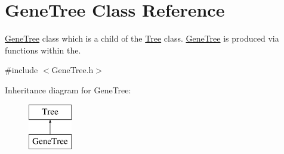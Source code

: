 \hypertarget{class_gene_tree}{}\section{Gene\+Tree Class Reference}
\label{class_gene_tree}


\mbox{\hyperlink{class_gene_tree}{Gene\+Tree}} class which is a child of the \mbox{\hyperlink{class_tree}{Tree}} class. \mbox{\hyperlink{class_gene_tree}{Gene\+Tree}} is produced via functions within the.  




{\ttfamily \#include $<$Gene\+Tree.\+h$>$}

Inheritance diagram for Gene\+Tree\+:\begin{figure}[H]
\begin{center}
\leavevmode
\includegraphics[height=2.000000cm]{class_gene_tree}
\end{center}
\end{figure}
